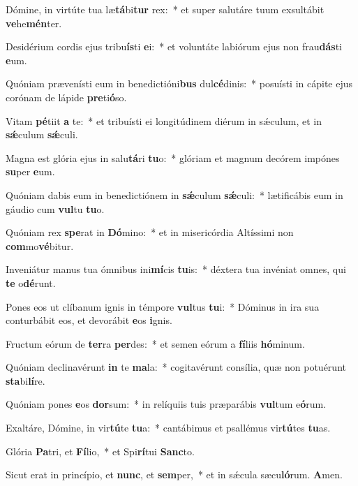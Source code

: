\item Dómine, in virtúte tua læ\textbf{tá}bi\textbf{tur} rex:~* et super salutáre tuum exsultábit \textbf{ve}he\textbf{mén}ter.
\item Desidérium cordis ejus tribu\textbf{ís}ti \textbf{e}i:~* et voluntáte labiórum ejus non frau\textbf{dás}ti \textbf{e}um.
\item Quóniam prævenísti eum in benedictióni\textbf{bus} dul\textbf{cé}dinis:~* posuísti in cápite ejus corónam de lápide \textbf{pre}ti\textbf{ó}so.
\item Vitam \textbf{pé}tiit \textbf{a} te:~* et tribuísti ei longitúdinem diérum in sǽculum, et in \textbf{sǽ}culum \textbf{sǽ}culi.
\item Magna est glória ejus in salu\textbf{tá}ri \textbf{tu}o:~* glóriam et magnum decórem impónes \textbf{su}per \textbf{e}um.
\item Quóniam dabis eum in benedictiónem in \textbf{sǽ}culum \textbf{sǽ}culi:~* lætificábis eum in gáudio cum \textbf{vul}tu \textbf{tu}o.
\item Quóniam rex \textbf{spe}rat in \textbf{Dó}mino:~* et in misericórdia Altíssimi non \textbf{com}mo\textbf{vé}bitur.
\item Inveniátur manus tua ómnibus ini\textbf{mí}cis \textbf{tu}is:~* déxtera tua invéniat omnes, qui \textbf{te} o\textbf{dé}runt.
\item Pones eos ut clíbanum ignis in témpore \textbf{vul}tus \textbf{tu}i:~* Dóminus in ira sua conturbábit eos, et devorábit \textbf{e}os \textbf{i}gnis.
\item Fructum eórum de \textbf{ter}ra \textbf{per}des:~* et semen eórum a \textbf{fí}liis \textbf{hó}minum.
\item Quóniam declinavérunt \textbf{in} te \textbf{ma}la:~* cogitavérunt consília, quæ non potuérunt \textbf{sta}bi\textbf{lí}re.
\item Quóniam pones \textbf{e}os \textbf{dor}sum:~* in relíquiis tuis præparábis \textbf{vul}tum e\textbf{ó}rum.
\item Exaltáre, Dómine, in vir\textbf{tú}te \textbf{tu}a:~* cantábimus et psallémus vir\textbf{tú}tes \textbf{tu}as.
\item Glória \textbf{Pa}tri, et \textbf{Fí}lio,~* et Spi\textbf{rí}tui \textbf{Sanc}to.
\item Sicut erat in princípio, et \textbf{nunc}, et \textbf{sem}per,~* et in sǽcula sæcu\textbf{ló}rum. \textbf{A}men.
